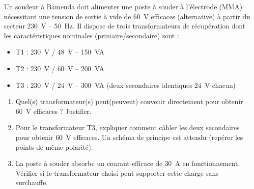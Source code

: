 \documentclass[11pt]{article}
\begin{document}
\begin{exercice}
Un soudeur à Bamenda doit alimenter une poste à souder à l'électrode (MMA) nécessitant une tension de sortie à vide de \SI{60}{V} efficaces (alternative) à partir du secteur \SI{230}{V} -- \SI{50}{Hz}. Il dispose de trois transformateurs de récupération dont les caractéristiques nominales (primaire/secondaire) sont :
\begin{itemize}
    \item T1 : \SI{230}{V} / \SI{48}{V} -- \SI{150}{VA}
    \item T2 : \SI{230}{V} / \SI{60}{V} -- \SI{200}{VA}
    \item T3 : \SI{230}{V} / \SI{24}{V} -- \SI{300}{VA} (deux secondaires identiques \SI{24}{V} chacun)
\end{itemize}
\begin{enumerate}
    \item Quel(s) transformateur(s) peut(peuvent) convenir directement pour obtenir \SI{60}{V} efficaces ? Justifier.
    \item Pour le transformateur T3, expliquer comment câbler les deux secondaires pour obtenir \SI{60}{V} efficaces. Un schéma de principe est attendu (repérer les points de même polarité).
    \item La poste à souder absorbe un courant efficace de \SI{30}{A} en fonctionnement. Vérifier si le transformateur choisi peut supporter cette charge sans surchauffe.
\end{enumerate}
\end{exercice}
\end{document}
